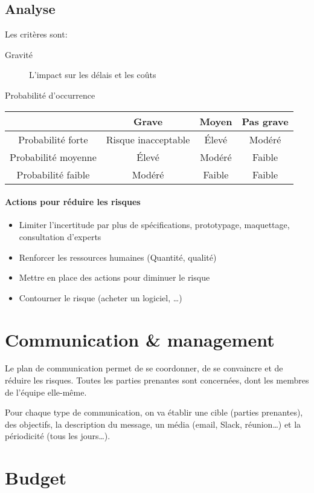 \documentclass[10pt,a4paper,french]{article}
\begin{document}
\subsection{Analyse}

Les critères sont:
\begin{description}
\item[Gravité] L'impact sur les délais et les coûts
\item[Probabilité d'occurrence]
\end{description}

\begin{tabular}{c|ccc}
& Grave & Moyen & Pas grave \\
\hline
Probabilité forte & Risque inacceptable & Élevé & Modéré \\
Probabilité moyenne & Élevé & Modéré & Faible \\
Probabilité faible & Modéré & Faible & Faible
\end{tabular}

\paragraph{Actions pour réduire les risques}
\begin{itemize}
\item Limiter l'incertitude par plus de spécifications, prototypage, maquettage, consultation d'experts
\item Renforcer les ressources humaines (Quantité, qualité)
\item Mettre en place des actions pour diminuer le risque
\item Contourner le risque (acheter un logiciel, \ldots)
\end{itemize}

\section{Communication \& management}

Le plan de communication permet de se coordonner, de se convaincre et de réduire les risques. Toutes les parties prenantes sont concernées, dont les membres de l'équipe elle-même.

Pour chaque type de communication, on va établir une cible (parties prenantes), des objectifs, la description du message, un média (email, Slack, réunion\ldots) et la périodicité (tous les jours\ldots).

\section{Budget}
\end{document}

